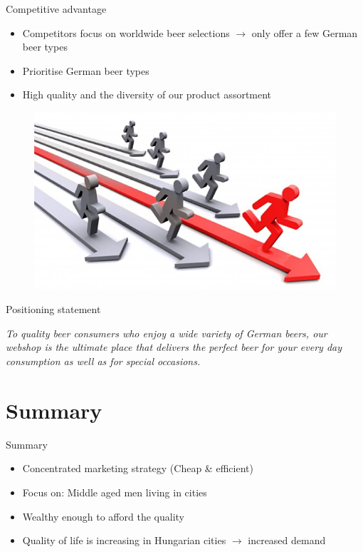 \documentclass[aspectratio=43]{beamer}
\begin{document}
\begin{frame}{Competitive advantage}
\begin{itemize}
   \item Competitors focus on worldwide beer selections $\rightarrow$ only offer a few German beer types
   \item Prioritise German beer types
   \item High quality and the diversity of our product assortment
\end{itemize}
\begin{figure}[H]
  \centering
  \includegraphics[width=0.57\linewidth]{pics/bullshit3.jpg}
\end{figure}
\end{frame}

\begin{frame}{Positioning statement}

      \textit{To quality beer consumers who enjoy a wide variety of German beers, our webshop is the ultimate place that delivers the perfect beer for your every day consumption as well as for special occasions.}

\end{frame}






\section{Summary}

\begin{frame}{Summary}
\begin{itemize}
   \item Concentrated marketing strategy (Cheap & efficient)
   \item Focus on: Middle aged men living in cities
   \item Wealthy enough to afford the quality
   \item Quality of life is increasing in Hungarian cities $\rightarrow$ increased demand
\end{itemize}
\end{frame}
\end{document}
